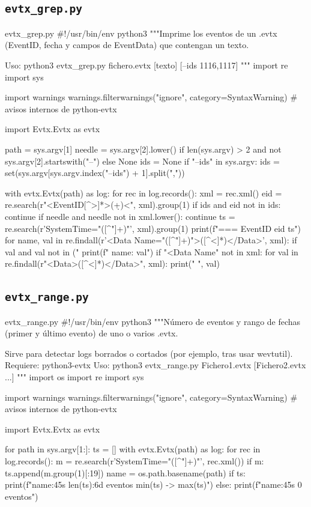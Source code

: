 \documentclass[11pt,a4paper]{article}
\begin{document}
\subsection{\texttt{evtx\_grep.py}}
\begin{codigopython}{evtx\_grep.py}
#!/usr/bin/env python3
"""Imprime los eventos de un .evtx (EventID, fecha y campos de EventData) que contengan un texto.

Uso: python3 evtx_grep.py fichero.evtx [texto] [--ids 1116,1117]
"""
import re
import sys

import warnings
warnings.filterwarnings("ignore", category=SyntaxWarning)  # avisos internos de python-evtx

import Evtx.Evtx as evtx

path = sys.argv[1]
needle = sys.argv[2].lower() if len(sys.argv) > 2 and not sys.argv[2].startswith("--") else None
ids = None
if "--ids" in sys.argv:
    ids = set(sys.argv[sys.argv.index("--ids") + 1].split(","))

with evtx.Evtx(path) as log:
    for rec in log.records():
        xml = rec.xml()
        eid = re.search(r"<EventID[^>]*>(\d+)<", xml).group(1)
        if ids and eid not in ids:
            continue
        if needle and needle not in xml.lower():
            continue
        ts = re.search(r'SystemTime="([^"]+)"', xml).group(1)
        print(f"=== EventID {eid}  {ts}")
        for name, val in re.findall(r'<Data Name="([^"]+)">([^<]*)</Data>', xml):
            if val and val not in ("%
                print(f"   {name}: {val}")
        if "<Data Name" not in xml:
            for val in re.findall(r"<Data>([^<]*)</Data>", xml):
                print("   ", val)
\end{codigopython}
\subsection{\texttt{evtx\_range.py}}
\begin{codigopython}{evtx\_range.py}
#!/usr/bin/env python3
"""Número de eventos y rango de fechas (primer y último evento) de uno o varios .evtx.

Sirve para detectar logs borrados o cortados (por ejemplo, tras usar wevtutil).
Requiere: python3-evtx
Uso: python3 evtx_range.py Fichero1.evtx [Fichero2.evtx ...]
"""
import os
import re
import sys

import warnings
warnings.filterwarnings("ignore", category=SyntaxWarning)  # avisos internos de python-evtx

import Evtx.Evtx as evtx

for path in sys.argv[1:]:
    ts = []
    with evtx.Evtx(path) as log:
        for rec in log.records():
            m = re.search(r'SystemTime="([^"]+)"', rec.xml())
            if m:
                ts.append(m.group(1)[:19])
    name = os.path.basename(path)
    if ts:
        print(f"{name:45s} {len(ts):6d} eventos   {min(ts)}  ->  {max(ts)}")
    else:
        print(f"{name:45s}      0 eventos")
\end{codigopython}
\end{document}
